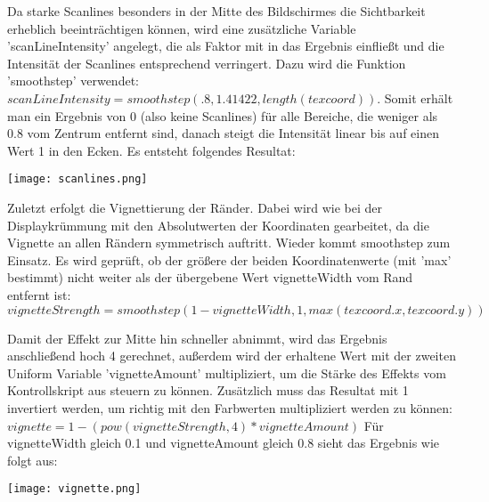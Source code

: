 Da starke Scanlines besonders in der Mitte des Bildschirmes die Sichtbarkeit erheblich beeinträchtigen können, wird eine zusätzliche Variable 'scanLineIntensity' angelegt, die als Faktor mit in das Ergebnis einflie{\ss}t und die Intensität der Scanlines entsprechend verringert. Dazu wird die Funktion 'smoothstep' verwendet: $scanLineIntensity = smoothstep(.8, 1.41422, length(texcoord))$. Somit erhält man ein Ergebnis von 0 (also keine Scanlines) für alle Bereiche, die weniger als 0.8 vom Zentrum entfernt sind, danach steigt die Intensität linear bis auf einen Wert 1 in den Ecken. Es entsteht folgendes Resultat:

\texttt{[image: scanlines.png]}

Zuletzt erfolgt die Vignettierung der Ränder. Dabei wird wie bei der Displaykrümmung mit den Absolutwerten der Koordinaten gearbeitet, da die Vignette an allen Rändern symmetrisch auftritt. Wieder kommt smoothstep zum Einsatz. Es wird geprüft, ob der grö{\ss}ere der beiden Koordinatenwerte (mit 'max' bestimmt) nicht weiter als der übergebene Wert vignetteWidth vom Rand entfernt ist: $vignetteStrength = smoothstep(1 - vignetteWidth, 1, max(texcoord.x, texcoord.y))$

Damit der Effekt zur Mitte hin schneller abnimmt, wird das Ergebnis anschlie{\ss}end hoch 4 gerechnet, au{\ss}erdem wird der erhaltene Wert mit der zweiten Uniform Variable 'vignetteAmount' multipliziert, um die Stärke des Effekts vom Kontrollskript aus steuern zu können. Zusätzlich muss das Resultat mit 1 invertiert werden, um richtig mit den Farbwerten multipliziert werden zu können: $vignette = 1 - (pow(vignetteStrength, 4) * vignetteAmount)$
Für vignetteWidth gleich 0.1 und vignetteAmount gleich 0.8 sieht das Ergebnis wie folgt aus:

\texttt{[image: vignette.png]}

